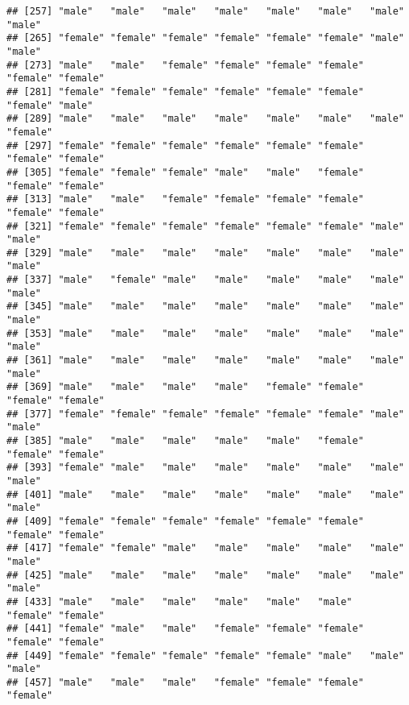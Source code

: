 \documentclass[
]{article}
\newenvironment{Shaded}{\begin{snugshade}}{\end{snugshade}}
\newcommand{\CommentTok}[1]{\textcolor[rgb]{0.56,0.35,0.01}{\textit{#1}}}
\newcommand{\NormalTok}[1]{#1}
\newcommand{\OperatorTok}[1]{\textcolor[rgb]{0.81,0.36,0.00}{\textbf{#1}}}
\newcommand{\StringTok}[1]{\textcolor[rgb]{0.31,0.60,0.02}{#1}}
\begin{document}
\begin{verbatim}
## [257] "male"   "male"   "male"   "male"   "male"   "male"   "male"   "male"  
## [265] "female" "female" "female" "female" "female" "female" "male"   "male"  
## [273] "male"   "male"   "female" "female" "female" "female" "female" "female"
## [281] "female" "female" "female" "female" "female" "female" "female" "male"  
## [289] "male"   "male"   "male"   "male"   "male"   "male"   "male"   "female"
## [297] "female" "female" "female" "female" "female" "female" "female" "female"
## [305] "female" "female" "female" "male"   "male"   "female" "female" "female"
## [313] "male"   "male"   "female" "female" "female" "female" "female" "female"
## [321] "female" "female" "female" "female" "female" "female" "male"   "male"  
## [329] "male"   "male"   "male"   "male"   "male"   "male"   "male"   "male"  
## [337] "male"   "female" "male"   "male"   "male"   "male"   "male"   "male"  
## [345] "male"   "male"   "male"   "male"   "male"   "male"   "male"   "male"  
## [353] "male"   "male"   "male"   "male"   "male"   "male"   "male"   "male"  
## [361] "male"   "male"   "male"   "male"   "male"   "male"   "male"   "male"  
## [369] "male"   "male"   "male"   "male"   "female" "female" "female" "female"
## [377] "female" "female" "female" "female" "female" "female" "male"   "male"  
## [385] "male"   "male"   "male"   "male"   "male"   "female" "female" "female"
## [393] "female" "male"   "male"   "male"   "male"   "male"   "male"   "male"  
## [401] "male"   "male"   "male"   "male"   "male"   "male"   "male"   "male"  
## [409] "female" "female" "female" "female" "female" "female" "female" "female"
## [417] "female" "female" "male"   "male"   "male"   "male"   "male"   "male"  
## [425] "male"   "male"   "male"   "male"   "male"   "male"   "male"   "male"  
## [433] "male"   "male"   "male"   "male"   "male"   "male"   "female" "female"
## [441] "female" "male"   "male"   "female" "female" "female" "female" "female"
## [449] "female" "female" "female" "female" "female" "male"   "male"   "male"  
## [457] "male"   "male"   "male"   "female" "female" "female" "female"
\end{verbatim}

\begin{Shaded}
\end{Shaded}
\end{document}
